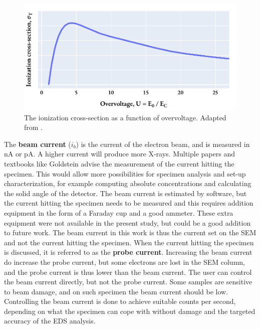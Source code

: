 \begin{figure}[hbt]
    \centering
    \includegraphics[width=0.6\linewidth]{figures/overvoltage2ionizationcrosssection.pdf}
    \caption{
        The ionization cross-section as a function of overvoltage.
        Adapted from \cite[Fig. 4.4]{williams_carter_tem_2009}.
    }
    \label{fig:overvoltage2ionizationcrosssection}
\end{figure}








The \textbf{beam current} ($i_b$) is the current of the electron beam, and is measured in nA or pA.
A higher current will produce more X-rays.
Multiple papers and textbooks like Goldstein advise the measurement of the current hitting the specimen.
This would allow more possibilities for specimen analysis and set-up characterization, for example computing absolute concentrations and calculating the solid angle of the detector.
The beam current is estimated by software, but the current hitting the specimen needs to be measured and this requires addition equipment in the form of a Faraday cup and a good ammeter.
These extra equipment were not available in the present study, but could be a good addition to future work.
The beam current in this work is thus the current set on the SEM and not the current hitting the specimen.
When the current hitting the specimen is discussed, it is referred to as the \textbf{probe current}.
Increasing the beam current do increase the probe current, but some electrons are lost in the SEM column, and the probe current is thus lower than the beam current.
The user can control the beam current directly, but not the probe current.
Some samples are sensitive to beam damage, and on such specimen the beam current should be low.
Controlling the beam current is done to achieve suitable counts per second, depending on what the specimen can cope with without damage and the targeted accuracy of the EDS analysis.


